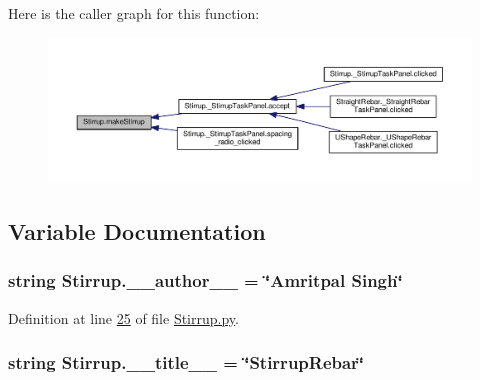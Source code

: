 Here is the caller graph for this function\+:\nopagebreak
\begin{figure}[H]
\begin{center}
\leavevmode
\includegraphics[width=350pt]{namespaceStirrup_a705fc121e2af9c8ac05eb299f4fb9f2f_icgraph}
\end{center}
\end{figure}




\subsection{Variable Documentation}
\subsubsection[{\texorpdfstring{\+\_\+\+\_\+author\+\_\+\+\_\+}{__author__}}]{\setlength{\rightskip}{0pt plus 5cm}string Stirrup.\+\_\+\+\_\+author\+\_\+\+\_\+ = \char`\"{}Amritpal Singh\char`\"{}\hspace{0.3cm}{\ttfamily [private]}}\hypertarget{namespaceStirrup_ad470a52dca49f918ddfef810e749291c}{}\label{namespaceStirrup_ad470a52dca49f918ddfef810e749291c}


Definition at line \hyperlink{Stirrup_8py_source_l00025}{25} of file \hyperlink{Stirrup_8py_source}{Stirrup.\+py}.

\subsubsection[{\texorpdfstring{\+\_\+\+\_\+title\+\_\+\+\_\+}{__title__}}]{\setlength{\rightskip}{0pt plus 5cm}string Stirrup.\+\_\+\+\_\+title\+\_\+\+\_\+ = \char`\"{}Stirrup\+Rebar\char`\"{}\hspace{0.3cm}{\ttfamily [private]}}\hypertarget{namespaceStirrup_aac4f16b6285f67fb07673ac264bac3dc}{}\label{namespaceStirrup_aac4f16b6285f67fb07673ac264bac3dc}



